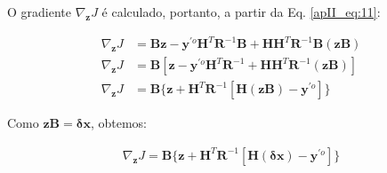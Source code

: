 O gradiente $\nabla_{\mathbf{z}}J$ é calculado, portanto, a partir da Eq. \ref{apII_eq:11}:




\begin{align}
\label{apII_eq:12}
\nabla_{\mathbf{z}}J & = \mathbf{B}\mathbf{z} - \mathbf{y}^{\prime{o}}\mathbf{H}^{T}\mathbf{R}^{-1}\mathbf{B} +
\mathbf{H}\mathbf{H}^{T}\mathbf{R}^{-1}\mathbf{B}(\mathbf{z}\mathbf{B}) \\
\label{apII_eq:13}
\nabla_{\mathbf{z}}J & = \mathbf{B}[\mathbf{z} - \mathbf{y}^{\prime{o}}\mathbf{H}^{T}\mathbf{R}^{-1} +
\mathbf{H}\mathbf{H}^{T}\mathbf{R}^{-1}(\mathbf{z}\mathbf{B})] \\
\label{apII_eq:14}
\nabla_{\mathbf{z}}J & = \mathbf{B}\lbrace\mathbf{z} + \mathbf{H}^{T}\mathbf{R}^{-1}[\mathbf{H}(\mathbf{z}\mathbf{B}) - \mathbf{y}^{\prime{o}}]\rbrace
\end{align}

Como $\mathbf{z}\mathbf{B}=\mathbf{\delta{x}}$, obtemos:

\begin{equation}
\label{apII_eq:15}
  \begin{split}
\nabla_{\mathbf{z}}J = 
\mathbf{B}
\lbrace
\mathbf{z} +
\mathbf{H}^{T}\mathbf{R}^{-1}
[
\mathbf{H}(\mathbf{\delta{x}})
- \mathbf{y}^{\prime{o}}
]
\rbrace
  \end{split}
\end{equation}

